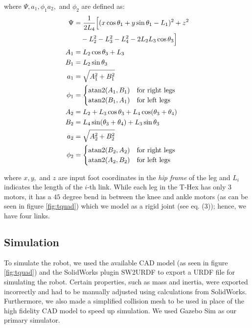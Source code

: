 where $\Psi, a_1, \phi_1 a_2,$ and $\phi_2$ are defined as:
\begin{align}
    \Psi &= \frac{1}{2L_4} \Big[ (x \cos\theta_1 + y \sin\theta_1 - L_1)^2 + z^2 \notag \\
    &\quad - L_2^2 - L_3^2 - L_4^2 - 2L_2 L_3 \cos\theta_3 \Big] \\
    A_1 &= L_2 \cos\theta_3 + L_3 \\
    B_1 &= L_2 \sin\theta_3 \\
    a_1 &= \sqrt{A_1^2 + B_1^2} \\
    \phi_1 &= 
    \begin{cases} 
        \text{atan2}(A_1, B_1) & \text{for right legs} \\
        \text{atan2}(B_1, A_1) & \text{for left legs}
    \end{cases} \\
    A_2 &= L_2 + L_3 \cos\theta_3 + L_4 \cos(\theta_3 + \theta_4) \\
    B_2 &= L_4 \sin(\theta_3 + \theta_4) + L_3 \sin\theta_3 \\
    a_2 &= \sqrt{A_2^2 + B_2^2} \\
    \phi_2 &= 
    \begin{cases} 
        \text{atan2}(B_2, A_2) & \text{for right legs} \\
        \text{atan2}(A_2, B_2) & \text{for left legs}
    \end{cases}
\end{align}

where $x, y,$ and $z$ are input foot coordinates in the \textit{hip frame} of the leg and $L_i$ indicates the length of the $i$-th link. While each leg in the T-Hex has only 3 motors, it has a $45$ degree bend in between the knee and ankle motors (as can be seen in figure \ref{fig:tquad}) which we model as a rigid joint (see eq. (3)); hence, we have four links.


\subsection{Simulation}

To simulate the robot, we used the available CAD model (as seen in figure \ref{fig:tquad}) and the SolidWorks plugin SW2URDF \cite{Sw_urdf_exporterROSWiki} to export a URDF file for simulating the robot. Certain properties, such as mass and inertia, were exported incorrectly and had to be manually adjusted using calculations from SolidWorks. Furthermore, we also made a simplified collision mesh to be used in place of the high fidelity CAD model to speed up simulation. We used Gazebo Sim as our primary simulator.

